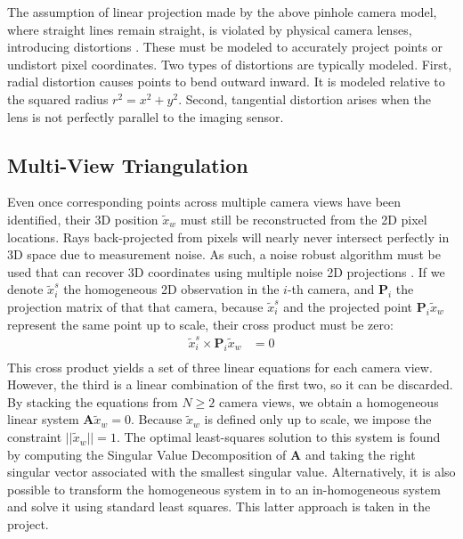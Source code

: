 The assumption of linear projection made by the above pinhole camera model, where straight lines remain straight, is violated by physical camera lenses, introducing distortions \parencite[p. 8]{Lanz2026Notes}. These must be modeled to accurately project points or undistort pixel coordinates. Two types of distortions are typically modeled. First, radial distortion causes points to bend outward inward. It is modeled relative to the squared radius $r^2 = x^2 + y^2$. Second, tangential distortion arises when the lens is not perfectly parallel to the imaging sensor.


\subsection{Multi-View Triangulation} \label{triangulate}

Even once corresponding points across multiple camera views have been identified, their 3D position $\tilde{x}_w$ must still be reconstructed from the 2D pixel locations. Rays back-projected from pixels will nearly never intersect perfectly in 3D space due to measurement noise. As such, a noise robust algorithm must be used that can recover 3D coordinates using multiple noise 2D projections \parencite[p. 16-17]{Lanz2026Notes} \parencite{hartley2003multiple}. If we denote $\tilde{x}_i^s$ the homogeneous 2D observation in the $i$-th camera, and $\mathbf{P}_i$ the projection matrix of that that camera, because $\tilde{x}_i^s$ and the projected point $\mathbf{P}_i \tilde{x}_w$ represent the same point up to scale, their cross product must be zero:
\begin{align*}
  \tilde{x}_i^s \times \mathbf{P}_i \tilde{x}_w &= 0 \\
\end{align*}
This cross product yields a set of three linear equations for each camera view. However, the third is a linear combination of the first two, so it can be discarded. By stacking the equations from $N \ge 2$ camera views, we obtain a homogeneous linear system $\mathbf{A} \tilde{x}_w = 0$. Because $\tilde{x}_w$ is defined only up to scale, we impose the constraint $||\tilde{x}_w|| = 1$. The optimal least-squares solution to this system is found by computing the Singular Value Decomposition of $\mathbf{A}$ and taking the right singular vector associated with the smallest singular value. Alternatively, it is also possible to transform the homogeneous system in to an in-homogeneous system and solve it using standard least squares. This latter approach is taken in the project.
